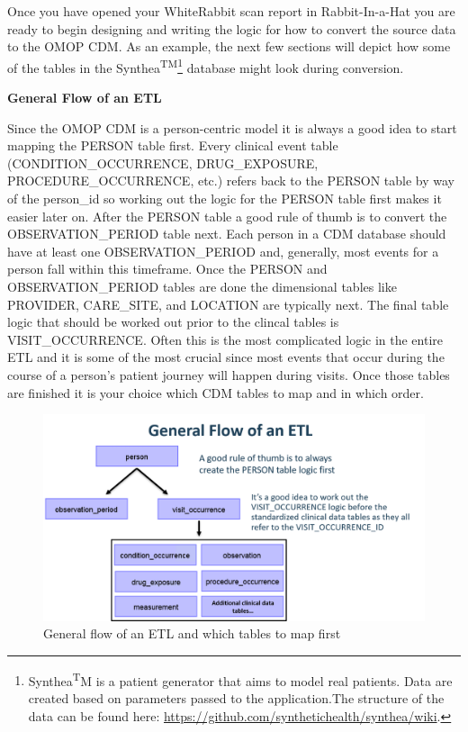 \documentclass[11pt]{book}
\let\rmarkdownfootnote\footnote%
\def\footnote{\protect\rmarkdownfootnote}
\theoremstyle{definition}
\theoremstyle{definition}
\theoremstyle{definition}
\theoremstyle{remark}
\begin{document}
Once you have opened your WhiteRabbit scan report in Rabbit-In-a-Hat you are ready to begin designing and writing the logic for how to convert the source data to the OMOP CDM. As an example, the next few sections will depict how some of the tables in the Synthea\textsuperscript{TM}\footnote{Synthea\textsuperscript{T}M is a patient generator that aims to model real patients. Data are created based on parameters passed to the application.The structure of the data can be found here: \url{https://github.com/synthetichealth/synthea/wiki}.} database might look during conversion.

\textbf{General Flow of an ETL}

Since the OMOP CDM is a person-centric model it is always a good idea to start mapping the PERSON table first. Every clinical event table (CONDITION\_OCCURRENCE, DRUG\_EXPOSURE, PROCEDURE\_OCCURRENCE, etc.) refers back to the PERSON table by way of the person\_id so working out the logic for the PERSON table first makes it easier later on. After the PERSON table a good rule of thumb is to convert the OBSERVATION\_PERIOD table next. Each person in a CDM database should have at least one OBSERVATION\_PERIOD and, generally, most events for a person fall within this timeframe. Once the PERSON and OBSERVATION\_PERIOD tables are done the dimensional tables like PROVIDER, CARE\_SITE, and LOCATION are typically next. The final table logic that should be worked out prior to the clincal tables is VISIT\_OCCURRENCE. Often this is the most complicated logic in the entire ETL and it is some of the most crucial since most events that occur during the course of a person's patient journey will happen during visits. Once those tables are finished it is your choice which CDM tables to map and in which order.

\begin{figure}
\includegraphics[width=1\linewidth]{images/ExtractTransformLoad/flowOfEtl} \caption{General flow of an ETL and which tables to map first}\label{fig:etlFlow}
\end{figure}
\end{document}
